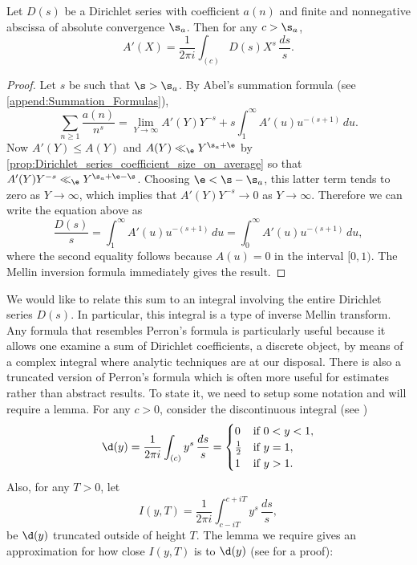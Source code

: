     \begin{theorem}
      Let $D(s)$ be a Dirichlet series with coefficient $a(n)$ and finite and nonnegative abscissa of absolute convergence $\s_{a}$. Then for any $c > \s_{a}$,
      \[
        A'(X) = \frac{1}{2\pi i}\int_{(c)}D(s)X^{s}\,\frac{ds}{s}.
      \]
    \end{theorem}
    \begin{proof}
      Let $s$ be such that $\s > \s_{a}$. By Abel's summation formula (see \cref{append:Summation_Formulas}),
      \[
        \sum_{n \ge 1}\frac{a(n)}{n^{s}} = \lim_{Y \to \infty}A'(Y)Y^{-s}+s\int_{1}^{\infty}A'(u)u^{-(s+1)}\,du.
      \]
      Now $A'(Y) \le A(Y)$ and $A(Y) \ll_{\e} Y^{\s_{a}+\e}$ by \cref{prop:Dirichlet_series_coefficient_size_on_average} so that $A'(Y)Y^{-s} \ll_{\e} Y^{\s_{a}+\e-\s}$. Choosing $\e < \s-\s_{a}$, this latter term tends to zero as $Y \to \infty$, which implies that $A'(Y)Y^{-s} \to 0$ as $Y \to \infty$. Therefore we can write the equation above as
      \[
        \frac{D(s)}{s} = \int_{1}^{\infty}A'(u)u^{-(s+1)}\,du = \int_{0}^{\infty}A'(u)u^{-(s+1)}\,du,
      \]
      where the second equality follows because $A(u) = 0$ in the interval $[0,1)$. The Mellin inversion formula immediately gives the result.
    \end{proof}

    We would like to relate this sum to an integral involving the entire Dirichlet series $D(s)$. In particular, this integral is a type of inverse Mellin transform. Any formula that resembles Perron's formula is particularly useful because it allows one examine a sum of Dirichlet coefficients, a discrete object, by means of a complex integral where analytic techniques are at our disposal. There is also a truncated version of Perron's formula which is often more useful for estimates rather than abstract results. To state it, we need to setup some notation and will require a lemma. For any $c > 0$, consider the discontinuous integral (see \cite{davenport1980multiplicative})
    \[
      \d(y) = \frac{1}{2\pi i}\int_{(c)}y^{s}\,\frac{ds}{s} = \begin{cases} 0 & \text{if $0 < y < 1$}, \\ \frac{1}{2} & \text{if $y = 1$}, \\ 1 & \text{if $y > 1$}. \end{cases}
    \]
    Also, for any $T > 0$, let
    \[
      I(y,T) = \frac{1}{2\pi i}\int_{c-iT}^{c+iT}y^{s}\,\frac{ds}{s},
    \]
    be $\d(y)$ truncated outside of height $T$. The lemma we require gives an approximation for how close $I(y,T)$ is to $\d(y)$ (see \cite{davenport1980multiplicative} for a proof):

